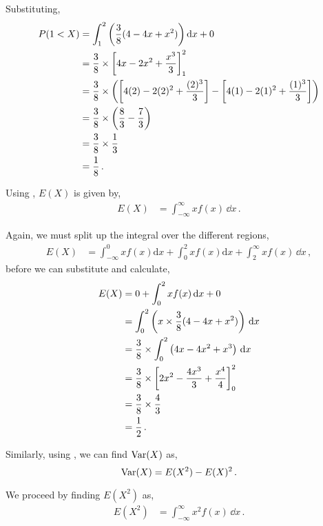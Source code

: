 \begin{subquestions}
\begin{subsubquestions}
Substituting, 
\begin{align}
P(1<X) & = \int_1^2 \left(\frac{3}{8}(4-4x+x^2) \right)\mathrm{d} x + 0\nonumber \\
	    & = \frac{3}{8} \times \left[4x-2x^2+\frac{x^3}{3} \right]_1^2 \nonumber \\
	    & = \frac{3}{8} \times \left(\left[4(2)-2(2)^2+\frac{(2)^3}{3} \right]-\left[4(1)-2(1)^2+\frac{(1)^3}{3} \right] \right) \nonumber \\
	    & = \frac{3}{8} \times \left( \frac{8}{3} - \frac{7}{3}\right) \nonumber \\
	    & = \frac{3}{8} \times \frac{1}{3} \nonumber \\
	    & = \frac{1}{8} \,.	
\end{align}

\subsubquestion

Using , $E(X)$ is given by,
\begin{align}
	E(X) & = \int_{-\infty}^{\infty}x f(x)\,\dd x \,.
\end{align}

Again, we must split up the integral over the different regions,
\begin{align}
	E(X) & = \int_{-\infty}^{0}x f(x)\mathrm{d}x + \int_{0}^{2}x f(x)\mathrm{d}x + \int_{2}^{\infty}x f(x)\,\dd x\,,
\end{align}
before we can substitute and calculate,
\begin{align}
	E(X) & = 0 + \int_{0}^{2}x f(x)\,\mathrm{d} x + 0 \nonumber \\
	     & = \int_{0}^{2} \left(x \times \frac{3}{8}(4-4x+x^2)\right)\,\mathrm{d} x \nonumber \\
	     & = \frac{3}{8} \times \int_{0}^{2} \left(4x-4x^2+x^3\right)\,\mathrm{d} x \nonumber \\
	     & = \frac{3}{8} \times \left[ 2x^2 - \frac{4x^3}{3} + \frac{x^4}{4}\right]_0^2 \nonumber \\
	     & = \frac{3}{8} \times \frac{4}{3} \nonumber \\
	     & = \frac{1}{2} \,. \\
\end{align}

Similarly, using , we can find $\text{Var}(X)$ as,
\begin{equation}
  \text{Var}(X) = E(X^2)- E(X)^2 \,.
\end{equation}

We proceed by finding $E(X^2)$ as,
\begin{align}
  E(X^2) & = \int_{-\infty}^{\infty}x^2 f(x)\,\dd x \,.
\end{align}


\end{subsubquestions}
\end{subquestions}
